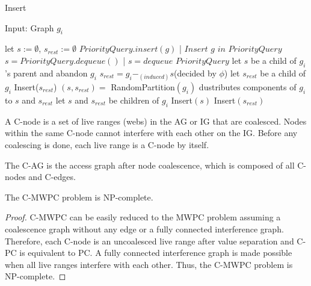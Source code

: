 \documentclass[prodmode,acmtecs]{acmsmall}
\begin{document}
\begin{algorithm}
\begin{algorithmic}[1]
\begin{algorithm}[t]
\caption{Insert}
\label{alg:alg1}
\begin{algorithmic}
\STATE Input: Graph $g_i$
\end{algorithmic}
\begin{algorithmic}[1]
\STATE let $s := \emptyset$, $s_{rest} := \emptyset$
			\STATE $PriorityQuery.insert(g)$ | $Insert$  $g$ $in$ $PriorityQuery$ 
		\ENDIF
	\ENDFOR
\ENDIF
{}
	\STATE $s = PriorityQuery.dequeue()$ | $s=dequeue$ $PriorityQuery$ 
		\STATE let $s$ be a child of $g_i$'s parent and abandon $g_i$
		\RETURN
	\ELSE
			\STATE $s_{rest} = g_i -_{(induced)} s$(decided by $\phi$)
				\STATE let $s_{rest}$ be a child of $g_i$
				\STATE Insert($s_{rest}$)
				\RETURN
			\ENDIF
		\ENDFOR
	\ENDIF
\ENDWHILE
{}
		\STATE $( s, s_{rest} ) =$ RandomPartition$(g_i)$
	\ELSE
		\STATE dustributes components of $g_i$ to $s$ and $s_{rest}$
	\ENDIF
	\STATE let $s$ and $s_{rest}$ be children of $g_i$
	\STATE Insert$(s)$	
	\STATE Insert$(s_{rest})$
\ENDIF
\end{algorithmic}
\end{algorithm}

\begin{definition}A C-node is a set of
live ranges (webs) in the AG or IG that are coalesced. Nodes within the same
C-node cannot interfere with each other on the IG. Before any coalescing is
done, each live range is a C-node by itself.
\end{definition}

\begin{definition}The C-AG is the access
graph after node coalescence, which is composed of all C-nodes and C-edges.
\end{definition}

\begin{lemma}
The C-MWPC problem is NP-complete.
\end{lemma}
\begin{proof} C-MWPC can be easily reduced to the MWPC problem assuming a
coalescence graph without any edge or a fully connected interference graph.
Therefore, each C-node is an uncoalesced live range after value separation
and C-PC is equivalent to PC. A fully connected interference graph is made
possible when all live ranges interfere with each other. Thus, the C-MWPC
problem is NP-complete.
\end{proof}


\end{algorithmic}
\end{algorithm}
\end{document}
